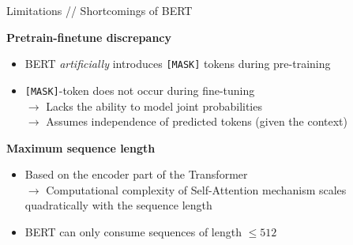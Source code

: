 \documentclass[]{beamer}
\begin{document}
\begin{frame}{Limitations // Shortcomings of BERT}

	\textbf{Pretrain-finetune discrepancy}
	
	\begin{itemize}
		\item BERT \textit{artificially} introduces \texttt{[MASK]} tokens during pre-training
		\item \texttt{[MASK]}-token does not occur during fine-tuning\\
					$\rightarrow$ Lacks the ability to model joint probabilities\\
					$\rightarrow$ Assumes independence of predicted tokens (given the context)
	\end{itemize}
	
	\vspace{.3cm}

	\textbf{Maximum sequence length}
	
	\begin{itemize}
		\item Based on the encoder part of the Transformer\\
					$\rightarrow$ Computational complexity of Self-Attention mechanism scales quadratically with the sequence length
		\item BERT can only consume sequences of length $\leq 512$
	\end{itemize}
\end{frame}
\end{document}
